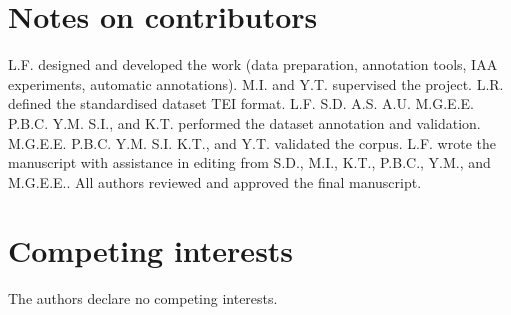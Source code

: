 \documentclass[]{interact}
\theoremstyle{plain}%
\theoremstyle{definition}
\theoremstyle{remark}
\begin{document}
\section*{Notes on contributors}

L.F. designed and developed the work (data preparation, annotation tools, IAA experiments, automatic annotations). M.I. and Y.T. supervised the project.
L.R. defined the standardised dataset TEI format.
L.F. S.D. A.S. A.U. M.G.E.E. P.B.C. Y.M. S.I., and K.T. performed the dataset annotation and validation.
M.G.E.E. P.B.C. Y.M. S.I. K.T., and Y.T. validated the corpus.
L.F. wrote the manuscript with assistance in editing from S.D., M.I., K.T., P.B.C., Y.M., and  M.G.E.E.. 
All authors reviewed and approved the final manuscript. 

\section*{Competing interests} 

The authors declare no competing interests.






\end{document}
